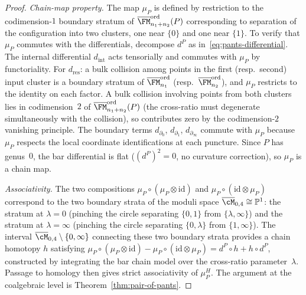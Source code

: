 \begin{proof}
\emph{Chain-map property.}
The map $\mu_P$ is defined by restriction to the
codimension-$1$ boundary stratum of
$\overline{\FM}_{n_1+n_2}^{\mathrm{ord}}(P)$
corresponding to separation of the configuration
into two clusters, one near $\{0\}$ and one near
$\{1\}$. To verify that $\mu_P$ commutes with the
differentials, decompose $d^P$ as
in~\eqref{eq:pants-differential}.
The internal differential $d_{\mathrm{int}}$ acts
tensorially and commutes with $\mu_P$ by functoriality.
For $d_{\mathrm{res}}$: a bulk collision among
points in the first (resp.\ second) input cluster
is a boundary stratum of
$\overline{\FM}_{n_1}^{\mathrm{ord}}$
(resp.\ $\overline{\FM}_{n_2}^{\mathrm{ord}}$), and
$\mu_P$ restricts to the identity on each factor.
A bulk collision involving points from both clusters
lies in codimension~$2$ of
$\overline{\FM}_{n_1+n_2}^{\mathrm{ord}}(P)$
(the cross-ratio must degenerate simultaneously with
the collision), so contributes zero by the
codimension-$2$ vanishing principle. The boundary
terms $d_{\partial_0}$, $d_{\partial_1}$,
$d_{\partial_\infty}$ commute with $\mu_P$ because
$\mu_P$ respects the local coordinate
identifications at each puncture. Since $P$ has
genus~$0$, the bar differential is flat
($(d^P)^2 = 0$, no curvature correction), so $\mu_P$
is a chain map.

\emph{Associativity.}
The two compositions
$\mu_P\circ(\mu_P\otimes\mathrm{id})$ and
$\mu_P\circ(\mathrm{id}\otimes\mu_P)$ correspond to
the two boundary strata of the moduli space
$\overline{\cM}_{0,4}\cong\mathbb{P}^1$:
the stratum at $\lambda=0$ (pinching the circle
separating $\{0,1\}$ from $\{\lambda,\infty\}$) and
the stratum at $\lambda=\infty$ (pinching the
circle separating $\{0,\lambda\}$ from
$\{1,\infty\}$). The interval
$\overline{\cM}_{0,4}\setminus\{0,\infty\}$
connecting these two boundary strata provides a
chain homotopy $h$ satisfying
$\mu_P\circ(\mu_P\otimes\mathrm{id})
-\mu_P\circ(\mathrm{id}\otimes\mu_P)
= d^P\circ h + h\circ d^P$,
constructed by integrating the bar chain model
over the cross-ratio parameter~$\lambda$.
Passage to homology then gives strict associativity
of $\mu_P^H$. The argument at the coalgebraic level is
Theorem~\textup{\ref{thm:pair-of-pants}}.
\end{proof}

